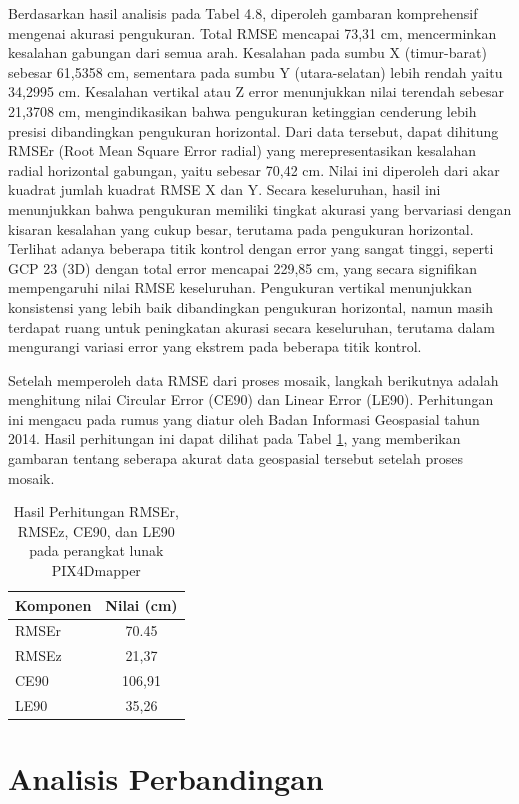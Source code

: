 Berdasarkan hasil analisis pada Tabel 4.8, diperoleh gambaran komprehensif mengenai akurasi pengukuran. Total RMSE mencapai 73,31 cm, mencerminkan kesalahan gabungan dari semua arah. Kesalahan pada sumbu X (timur-barat) sebesar 61,5358 cm, sementara pada sumbu Y (utara-selatan) lebih rendah yaitu 34,2995 cm. Kesalahan vertikal atau Z error menunjukkan nilai terendah sebesar 21,3708 cm, mengindikasikan bahwa pengukuran ketinggian cenderung lebih presisi dibandingkan pengukuran horizontal. Dari data tersebut, dapat dihitung RMSEr (Root Mean Square Error radial) yang merepresentasikan kesalahan radial horizontal gabungan, yaitu sebesar 70,42 cm. Nilai ini diperoleh dari akar kuadrat jumlah kuadrat RMSE X dan Y. Secara keseluruhan, hasil ini menunjukkan bahwa pengukuran memiliki tingkat akurasi yang bervariasi dengan kisaran kesalahan yang cukup besar, terutama pada pengukuran horizontal. Terlihat adanya beberapa titik kontrol dengan error yang sangat tinggi, seperti GCP 23 (3D) dengan total error mencapai 229,85 cm, yang secara signifikan mempengaruhi nilai RMSE keseluruhan. Pengukuran vertikal menunjukkan konsistensi yang lebih baik dibandingkan pengukuran horizontal, namun masih terdapat ruang untuk peningkatan akurasi secara keseluruhan, terutama dalam mengurangi variasi error yang ekstrem pada beberapa titik kontrol.

Setelah memperoleh data RMSE dari proses mosaik, langkah berikutnya adalah menghitung nilai Circular Error (CE90) dan Linear Error (LE90). Perhitungan ini mengacu pada rumus yang diatur oleh Badan Informasi Geospasial tahun 2014. Hasil perhitungan ini dapat dilihat pada Tabel \ref{tab:hasil_perhitungan le}, yang memberikan gambaran tentang seberapa akurat data geospasial tersebut setelah proses mosaik.

\begin{table}[H]
\centering
\caption{Hasil Perhitungan RMSEr, RMSEz, CE90, dan LE90 pada perangkat lunak PIX4Dmapper}
\begin{tabular}{|l|c|}
\hline
\textbf{Komponen} & \textbf{Nilai (cm)} \\
\hline
RMSEr & 70.45 \\
RMSEz & 21,37 \\
CE90 & 106,91 \\
LE90 & 35,26 \\
\hline
\end{tabular}
\label{tab:hasil_perhitungan le}
\end{table}

\section{Analisis Perbandingan}

